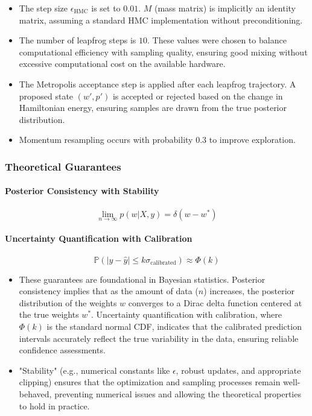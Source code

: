 \begin{itemize}

\item The step size $\epsilon_{\text{HMC}}$ is set to $0.01$. $M$ (mass matrix) is implicitly an identity matrix, assuming a standard HMC implementation without preconditioning.

\item The number of leapfrog steps is $10$. These values were chosen to balance computational efficiency with sampling quality, ensuring good mixing without excessive computational cost on the available hardware.

\item The Metropolis acceptance step is applied after each leapfrog trajectory. A proposed state $(w',p')$ is accepted or rejected based on the change in Hamiltonian energy, ensuring samples are drawn from the true posterior distribution.

\item Momentum resampling occurs with probability $0.3$ to improve exploration.

\end{itemize}

\subsubsection{Theoretical Guarantees}

\paragraph{Posterior Consistency with Stability}
\[
\lim_{n \to \infty} p(w|X,y) = \delta(w-w^*) 
\]

\paragraph{Uncertainty Quantification with Calibration}
\[
\mathbb{P}(|y - \hat{y}| \leq k\sigma_{\text{calibrated}}) \approx \Phi(k)
\]

\begin{itemize}

\item These guarantees are foundational in Bayesian statistics. Posterior consistency implies that as the amount of data ($n$) increases, the posterior distribution of the weights $w$ converges to a Dirac delta function centered at the true weights $w^*$. Uncertainty quantification with calibration, where $\Phi(k)$ is the standard normal CDF, indicates that the calibrated prediction intervals accurately reflect the true variability in the data, ensuring reliable confidence assessments. 

\item "Stability" (e.g., numerical constants like $\epsilon$, robust updates, and appropriate clipping) ensures that the optimization and sampling processes remain well-behaved, preventing numerical issues and allowing the theoretical properties to hold in practice.

\end{itemize}

